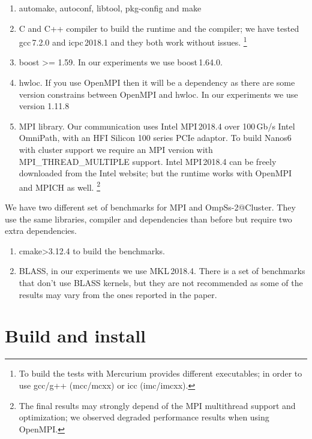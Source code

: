 \documentclass{article}
\begin{document}
\begin{enumerate}
    \item automake, autoconf, libtool, pkg-config and make

    \item C and C++ compiler to build the runtime and the compiler; we have
        tested gcc\,7.2.0 and icpc\,2018.1 and they both work without issues.
        \footnote{To build the tests with Mercurium provides different executables;
        in order to use gcc/g++ (mcc/mcxx) or icc (imc/imcxx).}

    \item boost >= 1.59. In our experiments we use boost\,1.64.0.

    \item hwloc. If you use OpenMPI then it will be a dependency as there are some
        version constrains between OpenMPI and hwloc. In our experiments we use
        version 1.11.8

    \item MPI library. Our communication uses Intel MPI\,2018.4 over 100\,Gb/s Intel
        OmniPath, with an HFI Silicon 100 series PCIe adaptor. To build Nanos6
        with cluster support we require an MPI version with
        MPI\_THREAD\_MULTIPLE support.  Intel MPI\,2018.4 can be freely
        downloaded from the Intel website; but the runtime works with OpenMPI
        and MPICH as well. \footnote{The final results may strongly depend of
        the MPI multithread support and optimization; we observed degraded
        performance results when using OpenMPI.}
\end{enumerate}

We have two different set of benchmarks for MPI and
OmpSs-2@Cluster. They use the same libraries, compiler and
dependencies than before but require two extra dependencies.

\begin{enumerate}
    \item cmake>3.12.4 to build the benchmarks.
    \item BLASS, in our experiments we use MKL\,2018.4. There is a set of benchmarks
        that don't use BLASS kernels, but they are not recommended as some of the
        results may vary from the ones reported in the paper.
\end{enumerate}

\section{Build and install}
\end{document}
